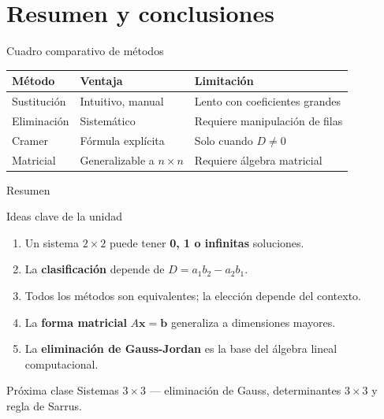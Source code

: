 \documentclass[11pt, aspectratio=169]{beamer}
\begin{document}
	\section{Resumen y conclusiones}
	
	\begin{frame}{Cuadro comparativo de métodos}
		\begin{table}
			\centering
			\renewcommand{\arraystretch}{1.4}
			\begin{tabular}{lll}
				\toprule
				\textbf{Método} & \textbf{Ventaja} & \textbf{Limitación} \\
				\midrule
				Sustitución & Intuitivo, manual & Lento con coeficientes grandes \\
				Eliminación & Sistemático & Requiere manipulación de filas \\
				Cramer       & Fórmula explícita & Solo cuando $D \neq 0$ \\
				Matricial    & Generalizable a $n\times n$ & Requiere álgebra matricial \\
				\bottomrule
			\end{tabular}
		\end{table}
	\end{frame}
	
	\begin{frame}{Resumen}
		\begin{block}{Ideas clave de la unidad}
			\begin{enumerate}
				\item Un sistema $2\times2$ puede tener \textbf{0, 1 o infinitas} soluciones.
				\item La \textbf{clasificación} depende de $D = a_1b_2 - a_2b_1$.
				\item Todos los métodos son equivalentes; la elección depende del contexto.
				\item La \textbf{forma matricial} $A\mathbf{x}=\mathbf{b}$ generaliza a dimensiones mayores.
				\item La \textbf{eliminación de Gauss-Jordan} es la base del álgebra lineal computacional.
			\end{enumerate}
		\end{block}
		
		\vspace{0.5em}
		\begin{exampleblock}{Próxima clase}
			Sistemas $3\times3$ — eliminación de Gauss, determinantes $3\times3$
			y regla de Sarrus.
		\end{exampleblock}
	\end{frame}
	
\end{document}
